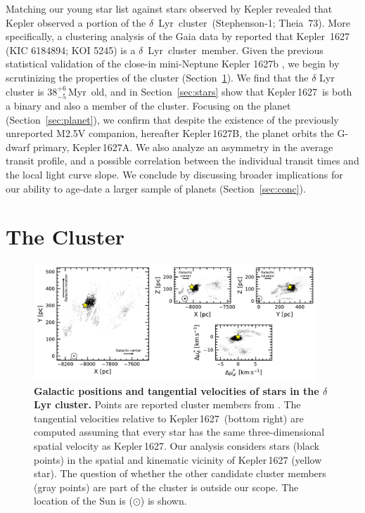 \documentclass[12pt,modern,twocolumn,tighten,linenumbers,trackchanges]{aastex63}
\newcommand{\cn}{$\delta$\ Lyr\ cluster} %
\newcommand{\sn}{Kepler\,1627} %
\newcommand{\clusterage}{$38^{+6}_{-5}$\,Myr} %
\begin{document}
Matching our young star list against stars observed by Kepler revealed
that Kepler observed a portion of the \cn\ (Stephenson-1; Theia~73).
More specifically, a clustering analysis of the Gaia data by
\citet{KounkelCovey2019} reported that Kepler~1627 (KIC 6184894; KOI
5245) is a \cn\ member.  Given the previous statistical
validation of the close-in mini-Neptune Kepler 1627b
\citep{2012ApJS..199...24T,morton_false_2016,thompson_planetary_2018},
we begin by scrutinizing the properties of the cluster
(Section~\ref{sec:cluster}).  We find that the $\delta$ Lyr cluster is
\clusterage\ old, and in Section~\ref{sec:stars} show that \sn\ is
both a binary and also a member of the cluster.  Focusing on the
planet (Section~\ref{sec:planet}), we confirm that despite the
existence of the previously unreported M2.5V companion, hereafter
Kepler\,1627B, the planet orbits the G-dwarf primary, Kepler\,1627A.
We also analyze an asymmetry in the average transit profile, and a
possible correlation between the individual transit times and the
local light curve slope.  We conclude by discussing broader
implications for our ability to age-date a larger sample of planets
(Section~\ref{sec:conc}).


\section{The Cluster}
\label{sec:cluster}

\begin{figure}[t]
	\begin{center}
		\leavevmode
		\includegraphics[width=0.95\textwidth]{f1.pdf}
	\end{center}
	\vspace{-0.7cm}
	\caption{
    {\bf Galactic positions  and tangential velocities   of stars in the
    $\delta$\,Lyr cluster.} Points are reported cluster members from
    \citet{KounkelCovey2019}.  The tangential velocities relative to
    \sn\ (bottom right) are computed assuming that every star has the
    same three-dimensional spatial velocity as \sn.  Our analysis
    considers stars (black points) in the spatial and kinematic
    vicinity of Kepler\,1627 (yellow star).  The question of whether
    the other candidate cluster members (gray points) are part of the
    cluster is outside our scope.  The location of the Sun is
    ($\odot$) is shown.
		\label{fig:XYZvtang}
	}
\end{figure}
\end{document}
